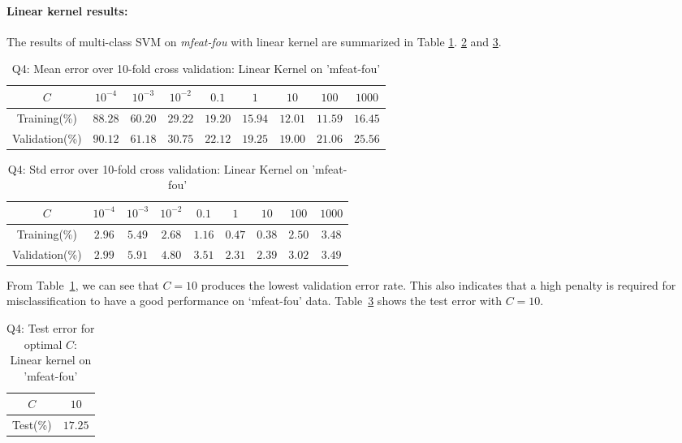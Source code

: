 \paragraph{Linear kernel results:}The results of multi-class SVM on \textit{mfeat-fou} with linear kernel are summarized in Table \ref{tbl:q4_linear_mean_diff_c}. \ref{tbl:q4_linear_std_diff_c} and \ref{tbl:q4_linear_test_error}.
\begin{table}[ht]
	\centering
	\caption{Q4: Mean error over 10-fold cross validation: Linear Kernel on 'mfeat-fou'}
	\begin{tabular}[t]{ccccccccc} 
		\hline
		$C$ 			& $10^{-4}$ & $10^{-3}$ & $10^{-2}$ & $0.1$ 	& $1$ 		& $10$ 		& $100$ 	& $1000$\\ [0.5ex] 
		\hline
		Training(\%) 	& $88.28$ 	& $60.20$ 	& $29.22$ 	& $19.20$ 	& $15.94$ 	& $12.01$ 	& $11.59$ 	& $16.45$\\
		Validation(\%) 	& $90.12$ 	& $61.18$ 	& $30.75$ 	& $22.12$ 	& $19.25$ 	& $19.00$ 	& $21.06$ 	& $25.56$\\[1ex]
		\hline
	\end{tabular}
	\label{tbl:q4_linear_mean_diff_c}
\end{table}
\begin{table}[ht]
	\centering
	\caption{Q4: Std error over 10-fold cross validation: Linear Kernel on 'mfeat-fou'}
	\begin{tabular}[t]{ccccccccc} 
		\hline
		$C$ 			& $10^{-4}$ & $10^{-3}$ & $10^{-2}$ & $0.1$ 	& $1$ 		& $10$ 		& $100$ 	& $1000$\\ [0.5ex] 
		\hline
		Training(\%) 	& $2.96$ 	& $5.49$ 	& $2.68$ 	& $1.16$ 	& $0.47$ 	& $0.38$ 	& $2.50$ 	& $3.48$\\
		Validation(\%) 	& $2.99$ 	& $5.91$ 	& $4.80$ 	& $3.51$ 	& $2.31$ 	& $2.39$ 	& $3.02$ 	& $3.49$\\[1ex]
		\hline
	\end{tabular}
	\label{tbl:q4_linear_std_diff_c}
\end{table}
From Table~\ref{tbl:q4_linear_mean_diff_c}, we can see that $C=10$ produces the lowest validation error rate. This also indicates that a high penalty is required for misclassification to have a good performance on `mfeat-fou' data. Table~\ref{tbl:q4_linear_test_error} shows the test error with $C=10$.
\begin{table}[ht]
	\centering
	\caption{Q4: Test error for optimal $C$: Linear kernel on 'mfeat-fou'}
	\begin{tabular}[t]{cc} 
		\hline
		$C$ & $10$ \\ [0.5ex] 
		\hline
		Test(\%) & $17.25$\\[1ex]
		\hline
	\end{tabular}
	\label{tbl:q4_linear_test_error}
\end{table}
